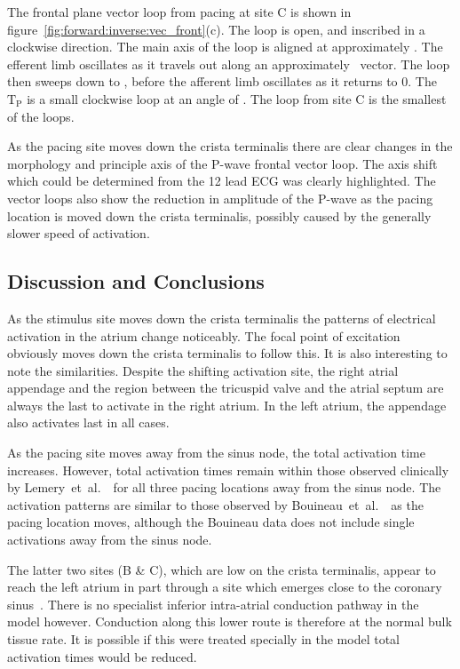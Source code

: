 The frontal plane vector loop from pacing at site C is shown in
figure~\ref{fig:forward:inverse:vec_front}(c).
The loop is open, and inscribed in a clockwise direction.
The main axis of the loop is aligned at approximately .
The efferent limb oscillates as it travels out along an approximately
\ vector.
The loop then sweeps down to , before the afferent limb oscillates as
it returns to 0.
The $\text{T}_{\text{P}}$ is a small clockwise loop at an angle of .
The loop from site C is the smallest of the loops.

As the pacing site moves down the crista terminalis there are clear changes in
the morphology and principle axis of the P-wave frontal vector loop.
The axis shift which could be determined from the 12 lead ECG was clearly
highlighted.
The vector loops also show the reduction in amplitude of the P-wave as the
pacing location is moved down the crista terminalis, possibly caused by the
generally slower speed of activation.

\subsection{Discussion and Conclusions}

As the stimulus site moves down the crista terminalis the patterns of electrical
activation in the atrium change noticeably.
The focal point of excitation obviously moves down the crista terminalis to
follow this.
It is also interesting to note the similarities.
Despite the shifting activation site, the right atrial appendage and the region
between the tricuspid valve and the atrial septum are always the last to
activate in the right atrium.
In the left atrium, the appendage also activates last in all cases.

As the pacing site moves away from the sinus node, the total activation time
increases.
However, total activation times remain within those observed clinically by
Lemery~et~al.~\cite{Lemery2004}\ for all three pacing locations away from the
sinus node.
The activation patterns are similar to those observed by
Bouineau~et~al.~\cite{Bouineau1988}\ as the pacing location moves, although the
Bouineau data does not include single activations away from the sinus node.

The latter two sites (B \& C), which are low on the crista terminalis, appear to
reach the left atrium in part through a site which emerges close to the coronary
sinus~\cite{Platonov2007,Platonov2008,Markides2003,Lemery2004}.
There is no specialist inferior intra-atrial conduction pathway in the model
however.
Conduction along this lower route is therefore at the normal bulk tissue rate.
It is possible if this were treated specially in the model total activation
times would be reduced.

